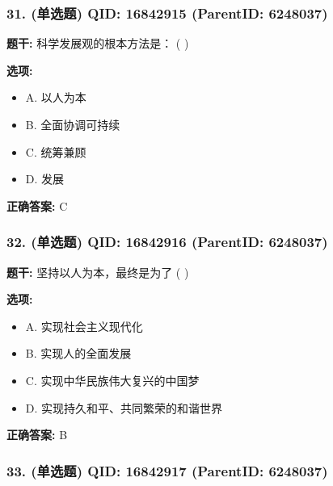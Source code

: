 \documentclass[12pt,UTF8]{ctexart}
\begin{document}
\subsubsection*{31. (单选题) \small QID: 16842915 (ParentID: 6248037)}

\textbf{题干:}
科学发展观的根本方法是： ( )



\textbf{选项:}
\begin{itemize}[leftmargin=*]

  \item A. 以人为本

  \item B. 全面协调可持续

  \item C. 统筹兼顾

  \item D. 发展

\end{itemize}

\textbf{正确答案:}
C

\vspace{0.3em}\hrulefill\vspace{0.7em}

\subsubsection*{32. (单选题) \small QID: 16842916 (ParentID: 6248037)}

\textbf{题干:}
坚持以人为本，最终是为了 ( )



\textbf{选项:}
\begin{itemize}[leftmargin=*]

  \item A. 实现社会主义现代化

  \item B. 实现人的全面发展

  \item C. 实现中华民族伟大复兴的中国梦

  \item D. 实现持久和平、共同繁荣的和谐世界

\end{itemize}

\textbf{正确答案:}
B

\vspace{0.3em}\hrulefill\vspace{0.7em}

\subsubsection*{33. (单选题) \small QID: 16842917 (ParentID: 6248037)}
\end{document}
